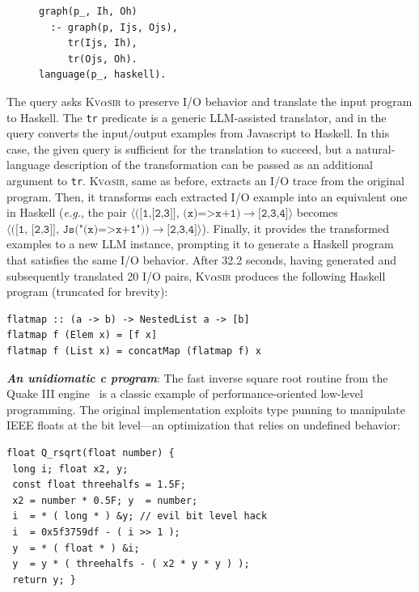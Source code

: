 \documentclass[nonacm,sigplan]{acmart}
\def\eg{{\em e.g.}, }
\newcommand{\sys}{{\scshape Kv{$\alpha$}sir}\xspace}
\newcommand{\heading}[1]{\vspace{2pt}\noindent\textbf{\emph{#1}}:\enspace}
\newcommand{\ttt}[1]{\texttt{#1}\xspace}
\begin{document}
\begin{figure}
\begin{verbatim}
graph(p_, Ih, Oh) 
  :- graph(p, Ijs, Ojs),
     tr(Ijs, Ih),
     tr(Ojs, Oh).
language(p_, haskell).
\end{verbatim}
\end{figure}
The query asks \sys to preserve I/O behavior and translate the input program to Haskell.
The \ttt{tr} predicate is a generic LLM-assisted translator, and in the query
converts the input/output examples from Javascript to Haskell.
In this case, the given query is sufficient for the translation to succeed, 
but a natural-language description of the transformation can be passed as an additional 
argument to \ttt{tr}.
\sys, same as before, extracts an I/O trace from the original program.
Then, it transforms each extracted I/O example into an equivalent one in Haskell (\eg 
the pair $\langle\ttt{([1,[2,3]], (x)=>x+1)}\to\ttt{[2,3,4]}\rangle$ 
becomes $\langle(\ttt{[1, [2,3]], Js("(x)=>x+1"))}\to\ttt{[2,3,4]}\rangle$).
Finally, it provides the transformed examples to a new LLM instance, prompting it
to generate a Haskell program that satisfies the same I/O behavior.
After 32.2 seconds, having generated and subsequently translated 20 I/O pairs,
\sys produces the following Haskell program (truncated for brevity):
\begin{verbatim}
flatmap :: (a -> b) -> NestedList a -> [b]
flatmap f (Elem x) = [f x]
flatmap f (List x) = concatMap (flatmap f) x
\end{verbatim}

\heading{An unidiomatic c program}
The fast inverse square root routine from the Quake III
engine~\cite{fast_inv_sqrt}
is a classic example of performance-oriented low-level programming.
The original implementation exploits type punning to manipulate IEEE
floats at the bit level---an optimization that relies on undefined behavior:

\begin{verbatim}
float Q_rsqrt(float number) {
 long i; float x2, y;
 const float threehalfs = 1.5F;
 x2 = number * 0.5F; y  = number;
 i  = * ( long * ) &y; // evil bit level hack
 i  = 0x5f3759df - ( i >> 1 );
 y  = * ( float * ) &i;
 y  = y * ( threehalfs - ( x2 * y * y ) );
 return y; }
\end{verbatim}
\end{document}
